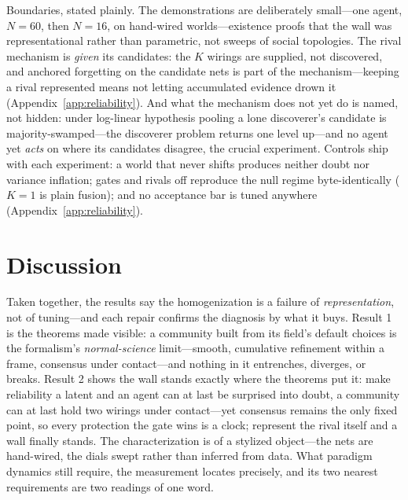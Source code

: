 \documentclass[runningheads]{llncs}
\begin{document}
Boundaries, stated plainly. The demonstrations are deliberately small---one agent, $N=60$,
then $N=16$, on hand-wired worlds---existence proofs that the wall was representational rather
than parametric, not sweeps of social topologies. The rival mechanism is \emph{given} its
candidates: the $K$ wirings are supplied, not discovered, and anchored forgetting on the
candidate nets is part of the mechanism---keeping a rival represented means not letting
accumulated evidence drown it (Appendix~\ref{app:reliability}). And what the mechanism does
not yet do is named, not hidden: under log-linear hypothesis pooling a lone discoverer's
candidate is majority-swamped---the discoverer problem returns one level up---and no agent yet
\emph{acts} on where its candidates disagree, the crucial experiment. Controls ship with each
experiment: a world that never shifts produces neither doubt nor variance inflation; gates and
rivals off reproduce the null regime byte-identically ($K=1$ is plain fusion); and no
acceptance bar is tuned anywhere (Appendix~\ref{app:reliability}).

\section{Discussion}
\label{sec:discussion}

Taken together, the results say the homogenization is a failure of \emph{representation}, not
of tuning---and each repair confirms the diagnosis by what it buys. Result 1 is the theorems
made visible: a community built from its field's default choices is the formalism's
\emph{normal-science} limit---smooth, cumulative refinement within a frame, consensus under
contact---and nothing in it entrenches, diverges, or breaks. Result 2 shows the wall stands
exactly where the theorems put it: make reliability a latent and an agent can at last be
surprised into doubt, a community can at last hold two wirings under contact---yet consensus
remains the only fixed point, so every protection the gate wins is a clock; represent the
rival itself and a wall finally stands. The characterization is of a stylized object---the
nets are hand-wired, the dials swept rather than inferred from data. What paradigm dynamics
still require, the measurement locates precisely, and its two nearest requirements are two
readings of one word.
\end{document}
